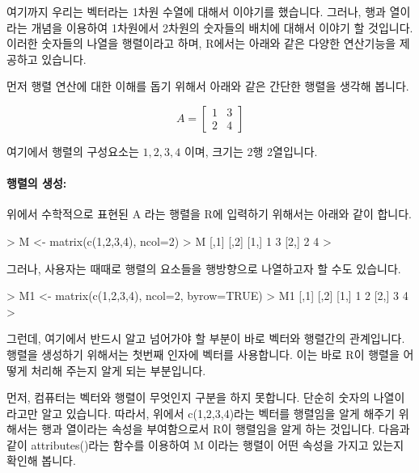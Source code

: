 \documentclass{book}
\begin{document}
여기까지 우리는 벡터라는 1차원 수열에 대해서 이야기를 했습니다. 
그러나, 행과 열이라는 개념을 이용하여 1차원에서 2차원의 숫자들의 배치에 대해서 이야기 할 것입니다. 
이러한 숫자들의 나열을 행렬이라고 하며, R에서는 아래와 같은 다양한 연산기능을 제공하고 있습니다. 

먼저 행렬 연산에 대한 이해를 돕기 위해서 아래와 같은 간단한 행렬을 생각해 봅니다. 

\begin{equation}
A = 
\begin{bmatrix}
1 & 3 \\
2 & 4 
\end{bmatrix}
\end{equation}

여기에서 행렬의 구성요소는 $1,2,3,4$ 이며, 크기는 2행 2열입니다.

\paragraph{행렬의 생성:} 위에서 수학적으로 표현된 A 라는 행렬을 R에 입력하기 위해서는 아래와 같이 합니다. 

\begin{Schunk}
\begin{Soutput}
> M <- matrix(c(1,2,3,4), ncol=2)
> M
     [,1] [,2]
[1,]    1    3
[2,]    2    4
>
\end{Soutput}
\end{Schunk}

그러나, 사용자는 때때로 행렬의 요소들을 행방향으로 나열하고자 할 수도 있습니다. 

\begin{Schunk}
\begin{Soutput}
> M1 <- matrix(c(1,2,3,4), ncol=2, byrow=TRUE)
> M1
     [,1] [,2]
[1,]    1    2
[2,]    3    4
>
\end{Soutput}
\end{Schunk}

그런데, 여기에서 반드시 알고 넘어가야 할 부분이 바로 벡터와 행렬간의 관계입니다. 
행렬을 생성하기 위해서는 첫번째 인자에 벡터를 사용합니다. 
이는 바로 R이 행렬을 어떻게 처리해 주는지 알게 되는 부분입니다. 

먼저, 컴퓨터는 벡터와 행렬이 무엇인지 구분을 하지 못합니다. 
단순히 숫자의 나열이라고만 알고 있습니다. 
따라서, 위에서 c(1,2,3,4)라는 벡터를 행렬임을 알게 해주기 위해서는 행과 열이라는 속성을 부여함으로서 R이 행렬임을 알게 하는 것입니다.
다음과 같이 attributes()라는 함수를 이용하여 M 이라는 행렬이 어떤 속성을 가지고 있는지 확인해 봅니다. 
\end{document}
